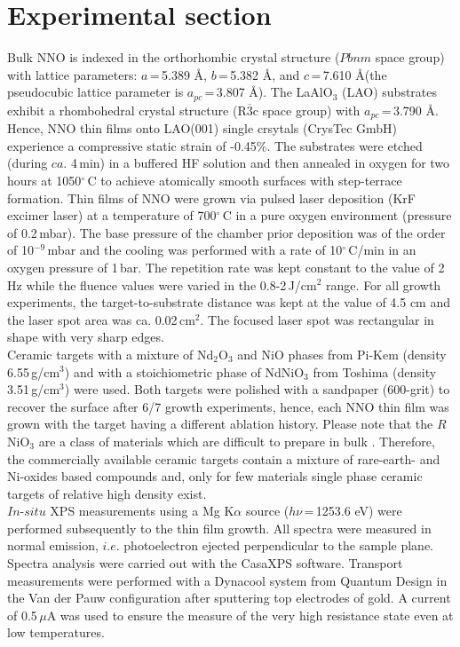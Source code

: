 \documentclass[aip,graphicx,numerical]{revtex4-1}
\begin{document}
\section{Experimental section}
Bulk NNO is indexed in the orthorhombic crystal structure ($Pbnm$ space group) with lattice parameters: $a$\,=\,5.389 \AA, $b$\,=\,5.382 \AA, and $c$\,=\,7.610 \AA (the pseudocubic lattice parameter is $a_{pc}$\,=\,3.807 \AA). The LaAlO$_3$ (LAO) substrates exhibit a rhombohedral crystal structure (R$\overline{3}$c space group) with $a_{pc}$\,=\,3.790 \AA. Hence, NNO thin films onto LAO(001) single crsytals (CrysTec GmbH) experience a compressive static strain of -0.45\%. The substrates were etched (during $ca.$ 4\,min) in a buffered HF solution and then annealed in oxygen for two hours at 1050$^{\circ}$\,C to achieve atomically smooth surfaces with step-terrace formation. Thin films of NNO were grown via pulsed laser deposition (KrF excimer laser) at a temperature of 700$^{\circ}$\,C in a pure oxygen environment (pressure of 0.2\,mbar). The base pressure of the chamber prior deposition was of the order of  10$^{-9}$\,mbar and the cooling was performed with a rate of 10$^{\circ}$\,C/min in an oxygen pressure of 1\,bar. The repetition rate was kept constant to the value of 2\,Hz while the fluence values were varied in the 0.8-2\,J/cm$^{2}$ range. For all growth experiments, the target-to-substrate distance was kept at the value of 4.5 cm and the laser spot area was ca. 0.02\,cm$^{2}$. The focused laser spot was rectangular in shape with very sharp edges. \\
Ceramic targets with a mixture of Nd$_{2}$O$_{3}$ and NiO phases from Pi-Kem (density 6.55\,g/cm$^{3}$) and with a stoichiometric phase of NdNiO$_{3}$ from Toshima (density 3.51\,g/cm$^{3}$) were used. Both targets were polished with a sandpaper (600-grit) to recover the surface after 6/7 growth experiments, hence, each NNO thin film was grown with the target having a different ablation history. Please note that the $\textit{R}$NiO$_3$ are a class of materials which are difficult to prepare in bulk\cite{Alonso2005} . Therefore, the commercially available ceramic targets contain a mixture of rare-earth- and Ni-oxides based compounds and, only for few materials single phase ceramic targets of relative high density exist.\\ $\textit{In-situ}$ XPS measurements using a Mg K$\alpha$ source ($h\nu$\,=\,1253.6 eV) were performed subsequently to the thin film growth. All spectra were measured in normal emission, $\textit{i.e.}$ photoelectron ejected perpendicular to the sample plane. Spectra analysis were carried out with the CasaXPS software. Transport measurements were performed with a Dynacool system from Quantum Design in the Van der Pauw configuration after sputtering top electrodes of gold. A current of 0.5\,$\mu$A was used to ensure the measure of the very high resistance state even at low temperatures. 
\end{document}
